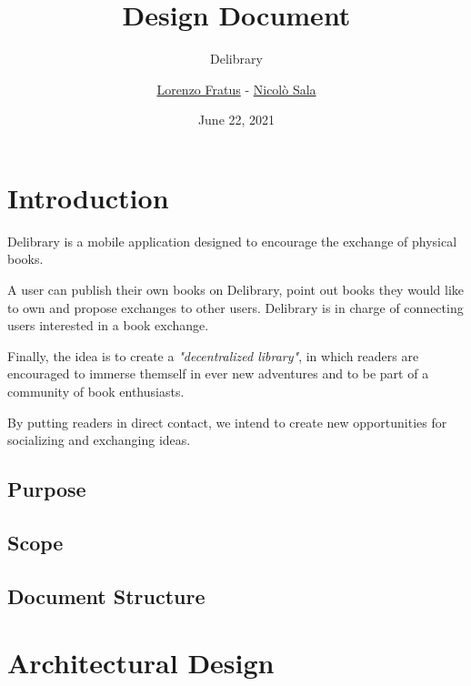 
\graphicspath{ {assets/} }

\title{Design Document}
\subtitle{Delibrary}
\author{\href{https://github.com/lorenzofratus}{Lorenzo Fratus} - \href{https://github.com/nicheosala}{Nicolò Sala}}
\date{June 22, 2021}



\maketitle

\tableofcontents



\chapter{Introduction}

Delibrary is a mobile application designed to encourage the exchange of physical books.

A user can publish their own books on Delibrary, point out books they would like to own and propose exchanges to other users.
Delibrary is in charge of connecting users interested in a book exchange.

Finally, the idea is to create a \emph{"decentralized library"}, in which readers are encouraged to immerse themself 
in ever new adventures and to be part of a community of book enthusiasts.

By putting readers in direct contact, we intend to create new opportunities for socializing and exchanging ideas.

\section{Purpose}

\section{Scope}

\section{Document Structure}



\chapter{Architectural Design}

